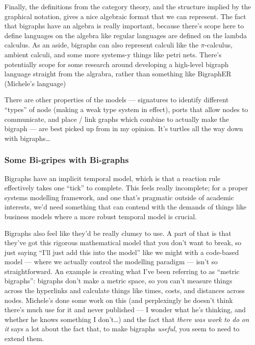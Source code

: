 \documentclass{article}
\begin{document}
Finally, the definitions from the category theory, and the structure implied by the graphical notation, gives a nice
algebraic format that we can represent. The fact that bigraphs have an algebra is really important, because there's
scope here to define languages on the algebra like regular languages are defined on the lambda calculus. As an aside,
bigraphs can also represent calculi like the \(\pi\)-calculus, ambient calculi, and some more systems-y things like
petri nets. There's potentially scope for some research around developing a high-level bigraph language straight from
the algrabra, rather than something like BigraphER (Michele's language\cite{michele:bigrapher})

There are other properties of the models --- signatures to identify different ``types'' of node (making a weak type
system in effect), ports that allow nodes to communicate, and place / link graphs which combine to actually make the
bigraph --- are best picked up from \cite{milner:bigraphsandtheiralgebra} in my opinion. It's turtles all the way down
with bigraphs\ldots{}

\subsubsection{Some Bi-gripes with Bi-graphs}

Bigraphs have an implicit temporal model, which is that a reaction rule effectively takes one ``tick'' to complete. This
feels really incomplete; for a proper systems modelling framework, and one that's pragmatic outside of academic
interests, we'd need something that can contend with the demands of things like business models where a more robust
temporal model is crucial.

Bigraphs also feel like they'd be really clumsy to use. A part of that is that they've got this rigorous mathematical
model that you don't want to break, so just saying ``I'll just add this into the model'' like we might with a code-based
model --- where we actually control the modelling paradigm --- isn't so straightforward. An example is creating what
I've been referring to as ``metric bigraphs'': bigraphs don't make a metric space, so you can't measure things across
the hyperlinks and calculate things like times, costs, and distances across nodes. Michele's done some work on this (and
perplexingly he doesn't think there's much use for it and never published --- I wonder what he's thinking, and whether
he knows something I don't\ldots{}) and the fact that \emph{there was work to do on it} says a lot about the fact that,
to make bigraphs \emph{useful}, you seem to need to extend them.\par
\end{document}

